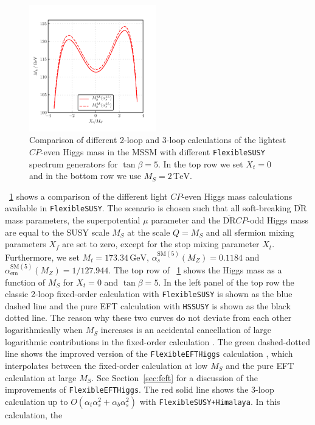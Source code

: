 \documentclass[final,3p,11pt,pdflatex]{elsarticle}
\makeatletter
\newcommand{\modelname}[1]{\texttt{#1}\@\xspace}
\newcommand{\fs}{\texttt{FlexibleSUSY}\@\xspace}
\newcommand{\HSSUSY}{\modelname{HSSUSY}}
\newcommand{\Himalaya}{\texttt{Himalaya}\@\xspace}
\newcommand{\fsh}{\texttt{FlexibleSUSY+}\Himalaya\xspace}
\newcommand{\feft}{\texttt{Flex\-ib\-le\-EFT\-Higgs}\@\xspace}
\newcommand{\ol}[1]{\overline{#1}}
\newcommand{\DRbar}{\ensuremath{\ol{\text{DR}}}\xspace}
\newcommand{\unit}[1]{\,\text{#1}}      %
\newcommand{\SM}{\ensuremath{\text{SM}}\xspace}
\newcommand{\MS}{\ensuremath{M_S}\xspace}
\newcommand{\figref}[1]{\figurename~\ref{#1}}
\newcommand{\secref}[1]{Section~\ref{#1}}
\newcommand{\CP}{\ensuremath{CP}\xspace}
\def\at{\alpha_t}
\def\ab{\alpha_b}
\def\as{\alpha_s}
\def\aem{\alpha_{\text{em}}}
\makeatother
\begin{document}
\begin{figure}[h!]
  \includegraphics[width=0.49\textwidth]{doc/plots/Himalaya/scan_Mh_Xt_TB-5_MS-2000_delta_alpha}
  \caption{Comparison of different 2-loop and 3-loop calculations of
    the lightest \CP-even Higgs mass in the MSSM with different \fs
    spectrum generators for $\tan\beta = 5$.  In the top row we set
    $X_t = 0$ and in the bottom row we use $\MS = 2\unit{TeV}$.}
  \label{fig:Mh-himalaya}
\end{figure}
%
\figref{fig:Mh-himalaya} shows a comparison of the different light
\CP-even Higgs mass calculations available in \fs.  The scenario is
chosen such that all soft-breaking \DRbar mass parameters, the
superpotential
$\mu$ parameter and the \DRbar \CP-odd Higgs mass are equal to the SUSY
scale $\MS$ at the scale $Q =
\MS$ and all sfermion mixing parameters
$X_f$ are set to zero, except for the stop mixing parameter
$X_t$.  Furthermore, we set $M_t =
173.34\unit{GeV}$, $\as^{\SM(5)}(M_Z) =
0.1184$ and $\aem^{\SM(5)}(M_Z) =
1/127.944$.  The top row of \figref{fig:Mh-himalaya} shows the Higgs
mass as a function of $\MS$ for $X_t = 0$ and $\tan\beta =
5$.  In the left panel of the top row the classic 2-loop fixed-order
calculation with \fs \cite{Athron:2014yba} is shown as the blue dashed
line and the pure EFT calculation with \HSSUSY is shown as the black
dotted line.  The reason why these two curves do not deviate from each
other logarithmically when
$\MS$ increases is an accidental cancellation of large
logarithmic contributions in the fixed-order calculation
\cite{Athron:2016fuq}.  The green dashed-dotted line shows the
improved version of the \feft calculation \cite{Athron:2016fuq}, which
interpolates
between the fixed-order calculation at low \MS and the pure EFT
calculation at large \MS.  See \secref{sec:feft} for a discussion of
the improvements of \feft.  The red solid line shows the 3-loop
calculation up to $O(\at\as^2 +
\ab\as^2)$ with \fsh \cite{Harlander:2017kuc}.  In this calculation, the
\end{document}

